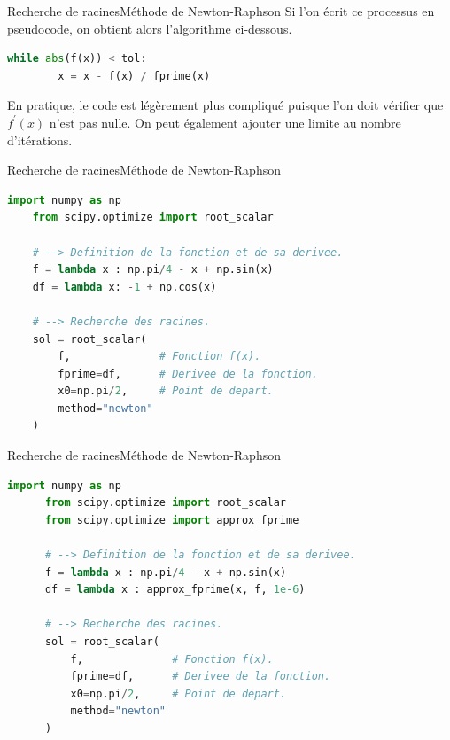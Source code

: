 \documentclass[usenames,dvipsnames,svgnames,10pt,aspectratio=169]{beamer}
\begin{document}
\begin{frame}[t, c, fragile]{Recherche de racines}{Méthode de Newton-Raphson}
  Si l'on écrit ce processus en pseudocode, on obtient alors l'algorithme ci-dessous.
  
  \bigskip
  
  \begin{lstlisting}[language=Python]
    while abs(f(x)) < tol:
        x = x - f(x) / fprime(x)
  \end{lstlisting}
  
  \medskip
  
  En pratique, le code est légèrement plus compliqué puisque l'on doit vérifier que $f^{\prime}(x)$ n'est pas nulle.
  On peut également ajouter une limite au nombre d'itérations.
\end{frame}

\begin{frame}[t, c, fragile]{Recherche de racines}{Méthode de Newton-Raphson}
  \begin{lstlisting}[language=Python]
    import numpy as np
    from scipy.optimize import root_scalar
    
    # --> Definition de la fonction et de sa derivee.
    f = lambda x : np.pi/4 - x + np.sin(x)
    df = lambda x: -1 + np.cos(x)
    
    # --> Recherche des racines.
    sol = root_scalar(
        f,              # Fonction f(x).
        fprime=df,      # Derivee de la fonction.
        x0=np.pi/2,     # Point de depart.
        method="newton"
    )

  \end{lstlisting}
\end{frame}

\begin{frame}[t, c, fragile]{Recherche de racines}{Méthode de Newton-Raphson}
  \begin{minipage}{.68\textwidth}
    \begin{lstlisting}[language=Python]
      import numpy as np
      from scipy.optimize import root_scalar
      from scipy.optimize import approx_fprime
      
      # --> Definition de la fonction et de sa derivee.
      f = lambda x : np.pi/4 - x + np.sin(x)
      df = lambda x : approx_fprime(x, f, 1e-6)
      
      # --> Recherche des racines.
      sol = root_scalar(
          f,              # Fonction f(x).
          fprime=df,      # Derivee de la fonction.
          x0=np.pi/2,     # Point de depart.
          method="newton"
      )
    \end{lstlisting}
  \end{minipage}%
  \hfill
  \begin{minipage}{.28\textwidth}
  \end{minipage}
\end{frame}
\end{document}
